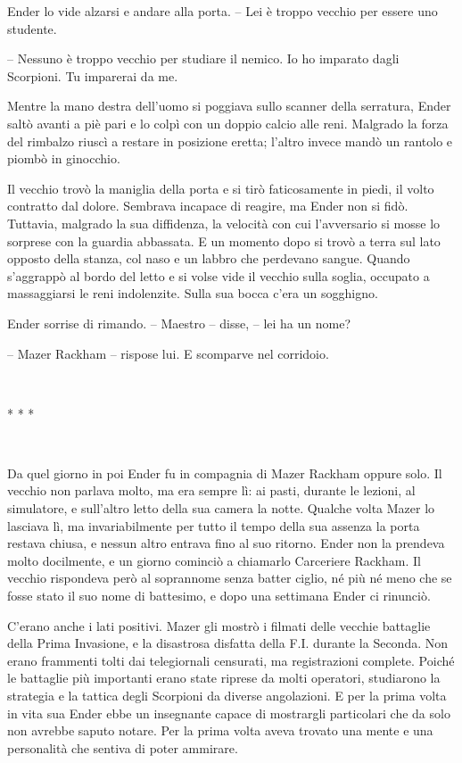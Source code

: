 {Ender lo vide alzarsi e andare alla porta. -- Lei è troppo vecchio per
	essere uno studente.}

{-- Nessuno è troppo vecchio per studiare il nemico. Io ho imparato
	dagli Scorpioni. Tu imparerai da me.}

{Mentre la mano destra dell'uomo si poggiava sullo scanner della
	serratura, Ender saltò avanti a piè pari e lo colpì con un doppio calcio
	alle reni. Malgrado la forza del rimbalzo riuscì a restare in posizione
	eretta; l'altro invece mandò un rantolo e piombò in ginocchio.}

{Il vecchio trovò la maniglia della porta e si tirò faticosamente in
	piedi, il volto contratto dal dolore. Sembrava incapace di reagire, ma
	Ender non si fidò. Tuttavia, malgrado la sua diffidenza, la velocità con
	cui l'avversario si mosse lo sorprese con la guardia abbassata. E un
	momento dopo si trovò a terra sul lato opposto della stanza, col naso e
	un labbro che perdevano sangue. Quando s'aggrappò al bordo del letto e
	si volse vide il vecchio sulla soglia, occupato a massaggiarsi le reni
	indolenzite. Sulla sua bocca c'era un sogghigno.}

{Ender sorrise di rimando. -- Maestro -- disse, -- lei ha un nome?}

{-- Mazer Rackham -- rispose lui. E scomparve nel corridoio.}

{~}

\begin{center}
	{* * *}
\end{center}

{~}

{Da quel giorno in poi Ender fu in compagnia di Mazer Rackham oppure
	solo. Il vecchio non parlava molto, ma era sempre lì: ai pasti, durante
	le lezioni, al simulatore, e sull'altro letto della sua camera la notte.
	Qualche volta Mazer lo lasciava lì, ma invariabilmente per tutto il
	tempo della sua assenza la porta restava chiusa, e nessun altro entrava
	fino al suo ritorno. Ender non la prendeva molto docilmente, e un giorno
	cominciò a chiamarlo Carceriere Rackham. Il vecchio rispondeva però al
	soprannome senza batter ciglio, né più né meno che se fosse stato il suo
	nome di battesimo, e dopo una settimana Ender ci rinunciò.}

{C'erano anche i lati positivi. Mazer gli mostrò i filmati delle vecchie
	battaglie della Prima Invasione, e la disastrosa disfatta della F.I.
	durante la Seconda. Non erano frammenti tolti dai telegiornali
	censurati, ma registrazioni complete. Poiché le battaglie più importanti
	erano state riprese da molti operatori, studiarono la strategia e la
	tattica degli Scorpioni da diverse angolazioni. E per la prima volta in
	vita sua Ender ebbe un insegnante capace di mostrargli particolari che
	da solo non avrebbe saputo notare. Per la prima volta aveva trovato una
	mente e una personalità che sentiva di poter ammirare.}

